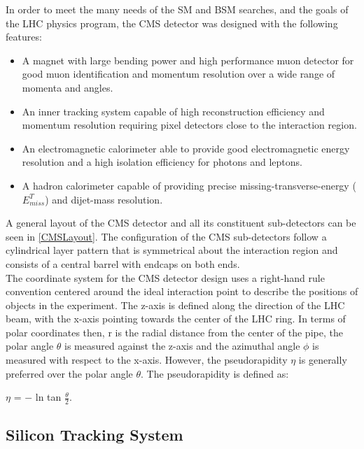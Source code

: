 In order to meet the many needs of the SM and BSM searches, and the goals of the LHC physics program, the CMS detector was designed with the following features:\\
\begin{itemize}
	\itemsep-1em
	\item{A magnet with large bending power and high performance muon detector for good muon identification and momentum resolution over a wide range of momenta and angles.}\\
	\item{An inner tracking system capable of high reconstruction efficiency and momentum resolution requiring pixel detectors close to the interaction region.}\\
	\item{An electromagnetic calorimeter able to provide good electromagnetic energy resolution and a high isolation efficiency for photons and leptons.}\\
	\item{A hadron calorimeter capable of providing precise missing-transverse-energy ($E^{T}_{miss}$)  and dijet-mass resolution.}\\
\end{itemize}

A general layout of the CMS detector and all its constituent sub-detectors can be seen in \autoref{CMSLayout}. The configuration of the CMS sub-detectors follow a cylindrical layer pattern that is symmetrical about the interaction region and consists of a central barrel with endcaps on both ends.\\

The coordinate system for the CMS detector design uses a right-hand rule convention centered around the ideal interaction point to describe the positions of objects in the experiment. The z-axis is defined along the direction of the LHC beam, with the x-axis pointing towards the center of the LHC ring. In terms of polar coordinates then, r is the radial distance from the center of the pipe, the polar angle $\theta$ is measured against the z-axis and the azimuthal angle $\phi$ is measured with respect to the x-axis. However, the pseudorapidity $\eta$ is generally preferred over the polar angle $\theta$. The pseudorapidity is defined as:

\begin{center}
$\eta$ =  $-$ ln tan $\frac{\theta}{2}$.
\end{center}

\subsection{Silicon Tracking System}

